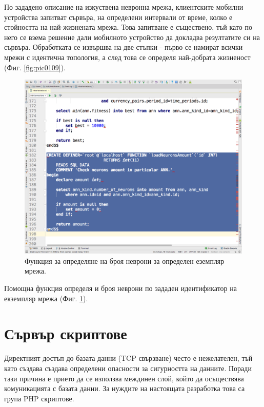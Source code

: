 \documentclass[book,14pt,oneside,openany]{memoir}
\begin{document}
По зададено описание на изкуствена невронна мрежа, клиентските мобилни устройства запитват сървъра, на определени интервали от време, колко е стойността на най-жизнената мрежа. Това запитване е съществено, тъй като по него се взема решение дали мобилното устройство да докладва резултатите си на сървъра. Обработката се извършва на две стъпки - първо се намират всички мрежи с идентична топология, а след това се определя най-добрата жизненост (Фиг. \ref{fig:pic0109}).

\begin{figure}[h]
  \centering
  \includegraphics[height=0.45\pdfpageheight]{pic0110}
  \caption{Функция за определяне на броя неврони за определен еземпляр мрежа.}
\label{fig:pic0110}
\end{figure}
\FloatBarrier

Помощна функция определя и броя неврони по зададен идентификатор на екземпляр мрежа (Фиг. \ref{fig:pic0110}).

\section{Сървър скриптове}

Директният достъп до базата данни (TCP свързване) често е нежелателен, тъй като създава създава определени опасности за сигурността на данните. Поради тази причина е прието да се използва междинен слой, който да осъществява комуникацията с базата данни. За нуждите на настоящата разработка това са група PHP скриптове. 
\end{document}
